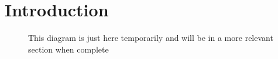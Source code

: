 \section{Introduction}

\begin{figure}
    \begin{center}
        
        \caption{This diagram is just here temporarily and will be in a more relevant section when complete}
    \end{center}
\end{figure}
